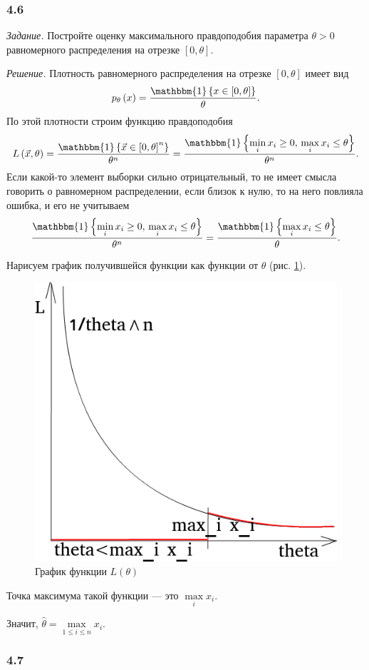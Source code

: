 \subsubsection*{4.6}

\textit{Задание.}
Постройте оценку максимального правдоподобия параметра $ \theta > 0$
равномерного распределения на отрезке $ \left[ 0, \theta \right] $.

\textit{Решение.}
Плотность равномерного распределения на отрезке $ \left[ 0, \theta \right] $ имеет вид
$$p_{ \theta } \left( x \right) =
  \frac{ \mathbbm{1} \left\{ x \in \left[ 0, \theta \right] \right\} }{ \theta }.$$
По этой плотности строим функцию правдоподобия
$$L \left( \vec{x}, \theta \right) =
  \frac{ \mathbbm{1} \left\{ \vec{x} \in \left[ 0, \theta \right]^n \right\} }{ \theta^n} =
  \frac{ \mathbbm{1} \left\{ \min \limits_i x_i \geq 0, \, \max \limits_i x_i \leq \theta \right\} }{ \theta^n}.$$
Если какой-то элемент выборки сильно отрицательный,
то не имеет смысла говорить о равномерном распределении, если близок к нулю,
то на него повлияла ошибка, и его не учитываем
$$ \frac{ \mathbbm{1} \left\{ \min \limits_i x_i \geq 0, \, \max \limits_i x_i \leq \theta \right\} }{ \theta^n} =
  \frac{ \mathbbm{1} \left\{ \max \limits_i x_i \leq \theta \right\} }{ \theta }.$$

Нарисуем график получившейся функции как функции от $ \theta $ (рис. \ref{fig:46}).

\begin{figure}[h!]
  \centering
  \includegraphics[width=.4\textwidth]{./pictures/4_6.png}
  \caption{График функции $L \left( \theta \right) $}
  \label{fig:46}
\end{figure}

Точка максимума такой функции --- это $ \max \limits_i x_i$.

Значит, $ \hat{ \theta } = \max \limits_{1 \leq i \leq n} x_i$.

\subsubsection*{4.7}

